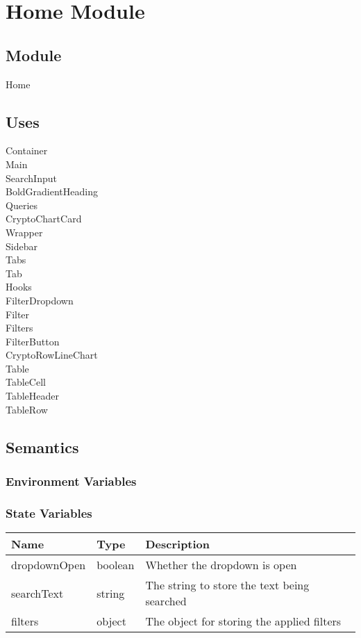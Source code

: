 \documentclass[12pt]{article}
\begin{document}
\section{Home Module}

\subsection{Module}
Home 

\subsection{Uses}
Container\\
Main\\
SearchInput\\
BoldGradientHeading\\
Queries\\
CryptoChartCard\\
Wrapper\\
Sidebar\\
Tabs\\
Tab\\
Hooks\\
FilterDropdown\\
Filter\\
Filters\\
FilterButton\\
CryptoRowLineChart\\
Table\\
TableCell\\
TableHeader\\
TableRow

\subsection{Semantics}

\subsubsection{Environment Variables}

\subsubsection{State Variables}
\begin{tabular}{| l | l | p{10cm} |}
    \hline
    \textbf{Name} & \textbf{Type} & \textbf{Description}\\ \hline
    dropdownOpen & boolean & Whether the dropdown is open\\ \hline
    searchText & string & The string to store the text being searched\\ \hline
    filters & object & The object for storing the applied filters \\ \hline
\end{tabular}
\end{document}
